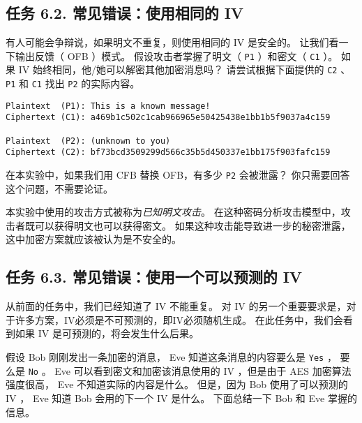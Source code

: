 \subsection{任务 6.2. 常见错误：使用相同的 IV}

有人可能会争辩说，如果明文不重复，则使用相同的 IV 是安全的。
让我们看一下输出反馈（ OFB ）模式。
假设攻击者掌握了明文（ \texttt{P1} ）和密文（ \texttt{C1} ）。
如果 IV 始终相同，他/她可以解密其他加密消息吗？
请尝试根据下面提供的 \texttt{C2} 、 \texttt{P1} 和 \texttt{C1}
找出 \texttt{P2} 的实际内容。


\begin{lstlisting}
Plaintext  (P1): This is a known message!
Ciphertext (C1): a469b1c502c1cab966965e50425438e1bb1b5f9037a4c159

Plaintext  (P2): (unknown to you)
Ciphertext (C2): bf73bcd3509299d566c35b5d450337e1bb175f903fafc159
\end{lstlisting}

在本实验中，如果我们用 CFB 替换 OFB，有多少 \texttt{P2} 会被泄露？
你只需要回答这个问题，不需要论证。

本实验中使用的攻击方式被称为\textit{已知明文攻击}。
在这种密码分析攻击模型中，攻击者既可以获得明文也可以获得密文。
如果这种攻击能导致进一步的秘密泄露，这中加密方案就应该被认为是不安全的。





\subsection{任务 6.3. 常见错误：使用一个可以预测的 IV}

从前面的任务中，我们已经知道了 IV 不能重复。
对 IV 的另一个重要要求是，对于许多方案，IV必须是不可预测的，即IV必须随机生成。
在此任务中，我们会看到如果 IV 是可预测的，将会发生什么后果。

假设 Bob 刚刚发出一条加密的消息， Eve 知道这条消息的内容要么是 \texttt{Yes} ，
要么是 \texttt{No} 。
Eve 可以看到密文和加密该消息使用的 IV ，但是由于 AES 加密算法强度很高，
Eve 不知道实际的内容是什么。
但是，因为 Bob 使用了可以预测的 IV ， Eve 知道 Bob 会用的下一个 IV 是什么。
下面总结一下 Bob 和 Eve 掌握的信息。

